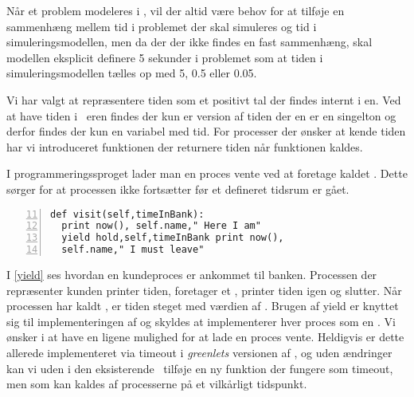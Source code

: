 Når et problem modeleres i \des, vil der altid være behov for at
tilføje en sammenhæng mellem tid i problemet der skal simuleres og tid i simuleringsmodellen, men da
der der ikke findes en fast sammenhæng, skal modellen  eksplicit
definere 5 sekunder i problemet som at tiden i simuleringsmodellen tælles op med 5, 0.5 eller 0.05.

Vi har valgt at repræsentere tiden som et positivt tal der findes internt i \sched en.
Ved at have tiden i  \sched ~eren findes der kun er version af tiden der \sched en er en singelton og  derfor findes der kun
en variabel med tid. For processer der ønsker at kende tiden har vi
introduceret funktionen  der returnere tiden når funktionen kaldes. 


I programmeringssproget \simpy lader man en proces vente ved at
foretage kaldet . Dette  sørger for at processen ikke
fortsætter før et defineret tidsrum er gået.

\begin{lstlisting}[firstnumber=11 , stepnumber=2, numbers=left,float=hbtp, label=yield, caption= Et yield i \simpy (Taget fra Bank05.py i eksemplet fra \simpy)] 
def visit(self,timeInBank): 
  print now(), self.name," Here I am" 
  yield hold,self,timeInBank print now(),
  self.name," I must leave" 
\end{lstlisting}

I \cref{yield} ses hvordan en kundeproces er ankommet til banken. Processen der repræsenter kunden printer tiden, foretager et , printer tiden igen og slutter. 
 Når processen har kaldt , er tiden steget med værdien af . Brugen af yield er knyttet
sig til implementeringen af \simpy og skyldes at \simpy implementerer
hver proces som en . Vi ønsker i \pycsp at have en
ligene mulighed for at lade en proces vente. Heldigvis er dette allerede implementeret via timeout i \emph{greenlets} versionen af \pycsp, og uden ændringer kan vi
uden i den eksisterende \sched ~tilføje en ny funktion
 der fungere som timeout, men som kan kaldes af processerne
på et vilkårligt tidspunkt. 

